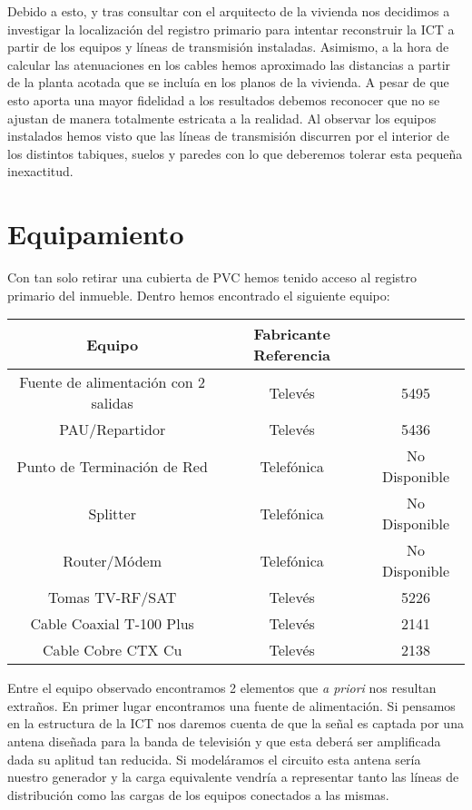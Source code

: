 \documentclass{article}[12 pt]
\begin{document}
		Debido a esto, y tras consultar con el arquitecto de la vivienda nos decidimos a investigar la localización del registro primario para intentar reconstruir la ICT a partir de los equipos y líneas de transmisión instaladas. Asimismo, a la hora de calcular las atenuaciones en los cables hemos aproximado las distancias a partir de la planta acotada que se incluía en los planos de la vivienda. A pesar de que esto aporta una mayor fidelidad a los resultados debemos reconocer que no se ajustan de manera totalmente estricata a la realidad. Al observar los equipos instalados hemos visto que las líneas de transmisión discurren por el interior de los distintos tabiques, suelos y paredes con lo que deberemos tolerar esta pequeña inexactitud.

	\section{Equipamiento}
		Con tan solo retirar una cubierta de PVC hemos tenido acceso al registro primario del inmueble. Dentro hemos encontrado el siguiente equipo:

		\begin{tabular}{| c | c | c |}
			\hline
			\textbf{Equipo} & \textbf{Fabricante} \textbf{Referencia}\\
			\hline
			Fuente de alimentación con 2 salidas & Televés & 5495\\
			\hline
			PAU/Repartidor & Televés & 5436\\
			\hline
			Punto de Terminación de Red & Telefónica & No Disponible\\
			\hline
			Splitter & Telefónica & No Disponible\\
			\hline
			Router/Módem & Telefónica & No Disponible\\
			\hline
			Tomas TV-RF/SAT & Televés & 5226\\
			\hline
			Cable Coaxial T-100 Plus & Televés & 2141\\
			\hline
			Cable Cobre CTX Cu & Televés & 2138\\
			\hline
		\end{tabular}

		Entre el equipo observado encontramos 2 elementos que \textit{a priori} nos resultan extraños. En primer lugar encontramos una fuente de alimentación. Si pensamos en la estructura de la ICT nos daremos cuenta de que la señal es captada por una antena diseñada para la banda de televisión y que esta deberá ser amplificada dada su aplitud tan reducida. Si modeláramos el circuito esta antena sería nuestro generador y la carga equivalente vendría a representar tanto las líneas de distribución como las cargas de los equipos conectados a las mismas.\\
\end{document}
